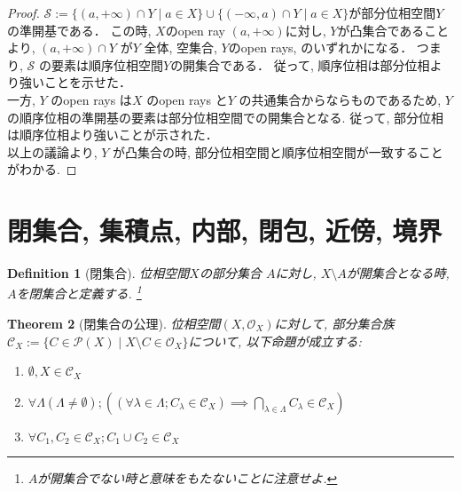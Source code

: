 \documentclass[lualatex]{ltjsbook}
\newtheorem{theorem}{Theorem}[chapter]
\newtheorem{definition}[theorem]{Definition}
\theoremstyle{remark}
\theoremstyle{plain}
\begin{document}
\begin{proof}
	$\mathcal{S}:=\{ \left( a,  +\infty \right) \cap Y  \mid a \in X \} \cup \{\left( - \infty , a\right) \cap Y  \mid  a \in X \}$が部分位相空間$Y$の準開基である．
	この時,  $X$のopen ray  $(a, + \infty)$に対し,  $Y$が凸集合であることより,  
	$\left( a,  +\infty \right) \cap Y$ が$Y$ 全体,  空集合,  $Y$のopen rays, のいずれかになる．
	つまり,   $\mathcal{S}$ の要素は順序位相空間$Y$の開集合である．
	従って,  順序位相は部分位相より強いことを示せた．\\
	一方,   $Y$ のopen rays は$X$ のopen rays と$Y$ の共通集合からならものであるため,  
	$Y$の順序位相の準開基の要素は部分位相空間での開集合となる. 
	従って,  部分位相は順序位相より強いことが示された．\\
	以上の議論より,   $Y$ が凸集合の時,  部分位相空間と順序位相空間が一致することがわかる.
\end{proof}


\section{閉集合,  集積点,  内部,  閉包,  近傍,  境界}


\begin{definition}[閉集合]
	位相空間$X$の部分集合 $A$に対し,   $X \setminus A$が開集合となる時,  $A$を閉集合と定義する. \footnote{$A$が開集合でない時と意味をもたないことに注意せよ.}
\end{definition}

\begin{theorem}[閉集合の公理]
	位相空間$\left( X,  \mathcal{O}_X \right) $に対して,  部分集合族$\mathcal{C}_X := \{C \in \mathcal{P}\left( X \right)  \mid X\setminus C \in \mathcal{O}_X \} $について,  以下命題が成立する:

	\begin{enumerate}
		\item $\emptyset ,  X  \in \mathcal{C}_X$ 
		\item $\forall \Lambda\left( \Lambda \neq \emptyset \right) ;\left( \left( \forall \lambda \in \Lambda; C_{\lambda} \in \mathcal{C}_X \right) \implies \bigcap_{\lambda \in \Lambda} C_{\lambda} \in \mathcal{C}_X \right)$
		\item $\forall C_1,  C_2 \in \mathcal{C}_X; C_1 \cup C_2 \in \mathcal{C}_X$
	\end{enumerate}

\end{theorem}
\end{document}
